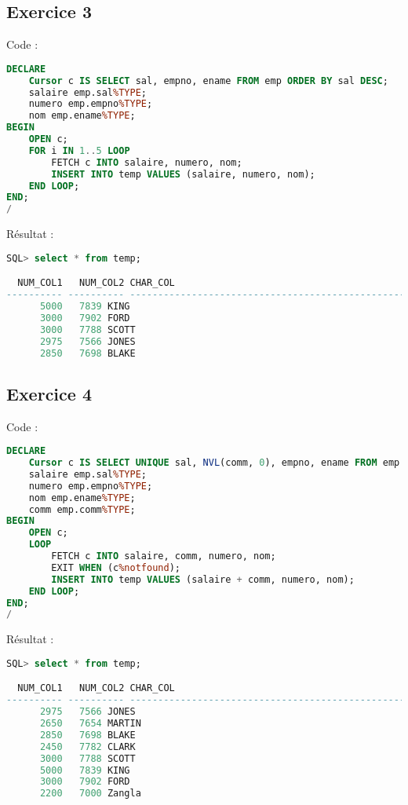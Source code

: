 \documentclass{article}
\begin{document}
\subsection{Exercice 3}
Code :
\begin{lstlisting}[language=SQL,
    deletekeywords={char},
    morekeywords={DECLARE, LOOP, TYPE, FOR, IF, IS, OPEN, FETCH, DBMS_OUTPUT, PUT_LINE}]
DECLARE
	Cursor c IS SELECT sal, empno, ename FROM emp ORDER BY sal DESC;
	salaire emp.sal%TYPE;
	numero emp.empno%TYPE;
	nom emp.ename%TYPE;
BEGIN
	OPEN c;
	FOR i IN 1..5 LOOP
		FETCH c INTO salaire, numero, nom;
		INSERT INTO temp VALUES (salaire, numero, nom);
	END LOOP;
END;
/
\end{lstlisting}

Résultat :
\begin{lstlisting}[language=SQL,
    morekeywords={DECLARE, LOOP, TYPE, FOR, IF, IS, OPEN, FETCH, DBMS_OUTPUT, PUT_LINE}]
SQL> select * from temp;

  NUM_COL1   NUM_COL2 CHAR_COL
---------- ---------- -------------------------------------------------------
      5000	 7839 KING
      3000	 7902 FORD
      3000	 7788 SCOTT
      2975	 7566 JONES
      2850	 7698 BLAKE
\end{lstlisting}

\subsection{Exercice 4}
Code :
\begin{lstlisting}[language=SQL,
    deletekeywords={char},
    morekeywords={DECLARE, LOOP, TYPE, FOR, IF, IS, OPEN, FETCH, DBMS_OUTPUT, PUT_LINE}]
DECLARE
    Cursor c IS SELECT UNIQUE sal, NVL(comm, 0), empno, ename FROM emp WHERE sal + NVL(comm, 0) > 2000;
    salaire emp.sal%TYPE;
    numero emp.empno%TYPE;
    nom emp.ename%TYPE;
    comm emp.comm%TYPE;
BEGIN
	OPEN c;
	LOOP
		FETCH c INTO salaire, comm, numero, nom;
		EXIT WHEN (c%notfound);
		INSERT INTO temp VALUES (salaire + comm, numero, nom);
	END LOOP;
END;
/
\end{lstlisting}

Résultat :
\begin{lstlisting}[language=SQL,
    morekeywords={DECLARE, LOOP, TYPE, FOR, IF, IS, OPEN, FETCH, DBMS_OUTPUT, PUT_LINE}]
SQL> select * from temp;

  NUM_COL1   NUM_COL2 CHAR_COL
---------- ---------- -------------------------------------------------------
      2975	 7566 JONES
      2650	 7654 MARTIN
      2850	 7698 BLAKE
      2450	 7782 CLARK
      3000	 7788 SCOTT
      5000	 7839 KING
      3000	 7902 FORD
      2200	 7000 Zangla
\end{lstlisting}
\end{document}
